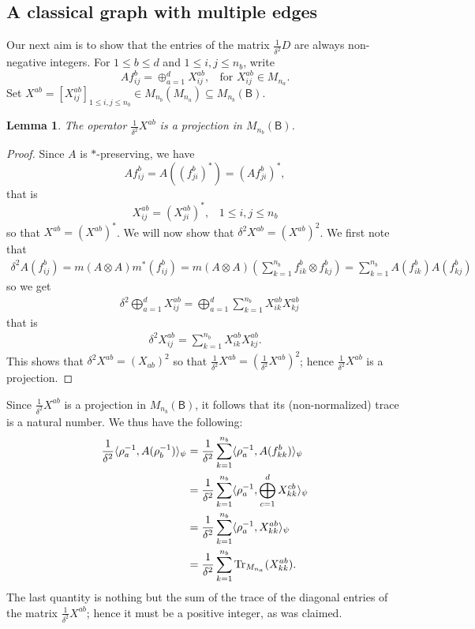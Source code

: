 \documentclass[a4paper,reqno]{amsart}
\numberwithin{equation}{section}
\numberwithin{theorem}{section}
\newtheorem{lemma}[theorem]{Lemma}
\theoremstyle{definition}\newtheorem{definition}[theorem]{Definition}
\theoremstyle{definition}\newtheorem{remark}[theorem]{Remark}
\theoremstyle{definition}\newtheorem{example}[theorem]{Example}
\theoremstyle{definition}\newtheorem*{notation*}{Notation}
\theoremstyle{definition}\newtheorem*{convention*}{Convention}
\theoremstyle{definition}\newtheorem{observation}{Observation}
\theoremstyle{definition}\newtheorem*{acknowledgment*}{Acknowledgments}
\newcommand{\B}{\mathsf{B}}
\begin{document}
\subsection{A classical graph with multiple edges}\label{subsec:int} Our next aim is to show that the entries of the matrix $\frac{1}{\delta^2}D$ are always non-negative integers.
For $1\leq b\leq d$ and $1\leq i,j\leq n_b$, write 
\[Af_{ij}^b=\oplus_{a=1}^d X_{ij}^{ab},\;\;\mbox{ for }X_{ij}^{ab}\in M_{n_a}.\]
Set $X^{ab}=[X_{ij}^{ab}]_{1\leq i,j\leq n_b}\in M_{n_b}(M_{n_a})\subseteq M_{n_b}(\B)$.

\begin{lemma}
    The operator $\frac{1}{\delta^2}X^{ab}$ is a projection in $M_{n_b}(\B)$.
\end{lemma}
\begin{proof}
Since $A$ is $\ast$-preserving, we have
\[Af_{ij}^{b}=A((f_{ji}^{b})^*)=(Af_{ji}^{b})^*,\]
that is
\[X_{ij}^{ab}=(X_{ji}^{ab})^*,\;\;\;1\leq i,j\leq n_b\]
so that $X^{ab}=(X^{ab})^*$. We will now show that $\delta^2 X^{ab}=(X^{ab})^2$. We first note that
\begin{align*}
    \delta^2 A(f_{{ij}}^{b})=m(A\otimes A)m^*(f_{ij}^{b})=m(A\otimes A)\left(\sum_{k=1}^{n_b}f_{ik}^b\otimes f_{kj}^b\right)=\sum_{k=1}^{n_b}A(f_{ik}^b)A(f_{kj}^b)
\end{align*}
so we get
\begin{align*}
    &\delta^2\bigoplus_{a=1}^dX_{ij}^{ab}=\bigoplus_{a=1}^d\sum_{k=1}^{n_b}X_{ik}^{ab}X_{kj}^{ab}    
    \end{align*}
    that is
     \begin{align*}
    \delta^2 X_{ij}^{ab}=\sum_{k=1}^{n_b}X_{ik}^{ab}X_{kj}^{ab}.
    \end{align*}
   This shows that  $\delta^2 X^{ab}= (X_{ab})^2$
    so that $\frac{1}{\delta^2}X^{ab}=(\frac{1}{\delta^2}X^{ab})^2$; hence $\frac{1}{\delta^2}X^{ab}$ is a projection.
    \end{proof}


    
Since $\frac{1}{\delta^2}X^{ab}$ is a projection in $M_{n_b}(\B)$, it follows that its (non-normalized) trace is a natural number. We thus have the following:
\begin{align*}
   \frac{1}{\delta^2}\langle\rho_a^{-1},A(\rho_b^{-1})\rangle_\psi&= \frac{1}{\delta^2}\sum_{k=1}^{n_b}\langle\rho_a^{-1}, A(f_{kk}^b)\rangle_\psi\\
   &= \frac{1}{\delta^2}\sum_{k=1}^{n_b}\langle\rho_a^{-1}, \bigoplus_{c=1}^dX_{kk}^{cb}\rangle_\psi\\
   &= \frac{1}{\delta^2}\sum_{k=1}^{n_b}\langle\rho_a^{-1}, X_{kk}^{ab}\rangle_\psi\\
   &= \frac{1}{\delta^2}\sum_{k=1}^{n_b}\Tr_{M_{n_a}}(X_{kk}^{ab}).
\end{align*}
The last quantity is nothing but the sum of the trace of the diagonal entries of the matrix $ \frac{1}{\delta^2}X^{ab}$; hence it must be a positive integer, as was claimed. 
\end{document}
